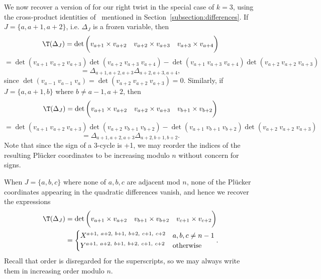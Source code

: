 We now recover a version of \cite[Proposition 3.5]{marshscott2016} for our right twist in the special case of $k=3$, using the cross-product identities of~\cite{s06} mentioned in Section~\ref{subsection:differences}. If~$J =\{ a, a+1, a+2\}$, i.e. $\Delta_J$ is a frozen variable, then 
\[\T(\Delta_J) = \det \bigg( v_{a+1} \times v_{a+2} \quad v_{a+2} \times v_{a+3} \quad v_{a+3} \times v_{a+4}\bigg) \]\[= \det(v_{a+1} \hspace{3pt} v_{a+2} \hspace{3pt} v_{a+3}) \det (v_{a+2}\hspace{3pt}  v_{a+3}\hspace{3pt} v_{a+4}) - \det (v_{a+1}\hspace{3pt} v_{a+3}\hspace{3pt} v_{a+4}) \det(v_{a+2}\hspace{3pt} v_{a+2}\hspace{3pt} v_{a+3}) \]\[= \Delta_{a+1,a+2,a+3} \Delta_{a+2,a+3,a+4},\]
since $\det(v_{a-1}\hspace{3pt} v_{a-1}\hspace{3pt} v_{a})=\det(v_{a+2}\hspace{3pt} v_{a+2}\hspace{3pt} v_{a+3}) = 0$.
Similarly, if $J = \{a,a+1, b\}$ where $b \neq a-1, a+2$, then 
\[\T(\Delta_J) = \det \bigg( v_{a+1} \times v_{a+2} \quad v_{a+2} \times v_{a+3} \quad v_{b+1} \times v_{b+2}\bigg) \]\[= \det(v_{a+1}\hspace{3pt} v_{a+2}\hspace{3pt} v_{a+3}) \det(v_{a+2}\hspace{3pt} v_{b+1}\hspace{3pt} v_{b+2}) - \det(v_{a+1}\hspace{3pt} v_{b+1}\hspace{3pt} v_{b+2}) \det(v_{a+2}\hspace{3pt} v_{a+2}\hspace{3pt} v_{a+3}) \]\[= \Delta_{a+1,a+2,a+3} \Delta_{a+2,b+1,b+2}.\]
Note that since the sign of a 3-cycle is +1, we may reorder the indices of the resulting Pl\"ucker coordinates to be increasing modulo $n$ without concern for signs.

When $J = \{a,b,c\}$ where none of $a,b,c$ are adjacent mod $n$, none of the Pl{\"u}cker coordinates appearing in the quadratic differences vanish, and hence we recover the expressions 
\begin{eqnarray*}\T(\Delta_J) &= \det \bigg( v_{a+1} \times v_{a+2} \quad v_{b+1} \times v_{b+2} \quad v_{c+1} \times v_{c+2}\bigg) \\
&=\begin{cases}
X^{a+1,~a+2,~b+1,~b+2,~c+1,~c+2} & a,b,c \neq n-1\\
Y^{a+1,~a+2,~b+1,~b+2,~c+1,~c+2} & \text{otherwise}
\end{cases}.\end{eqnarray*}
Recall that order is disregarded for the superscripts, so we may always write them in increasing order modulo $n$.


